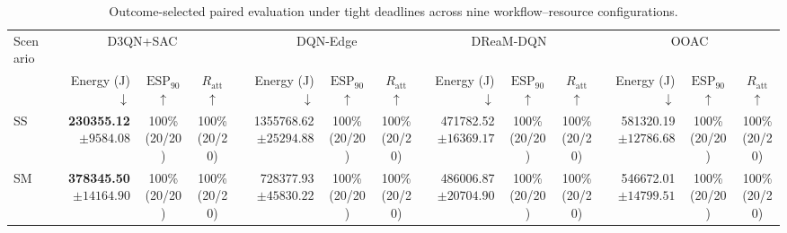 \documentclass[10pt]{article}
\begin{document}
\begin{table}[!htbp]
\centering
\caption{Outcome-selected paired evaluation under tight deadlines across nine workflow--resource configurations.}
\label{tab:conditional_full_tight}
\begingroup
\footnotesize
\setlength{\tabcolsep}{2.2pt}
\renewcommand{\arraystretch}{1.08}
\begin{tabular}{@{}l*{4}{rcc}@{}}
\toprule
Scenario & \multicolumn{3}{c}{D3QN+SAC} & \multicolumn{3}{c}{DQN-Edge} & \multicolumn{3}{c}{DReaM-DQN} & \multicolumn{3}{c}{OOAC} \\
\cmidrule(lr){2-4}\cmidrule(lr){5-7}\cmidrule(lr){8-10}\cmidrule(lr){11-13}
 & Energy (J) $\downarrow$ & $\mathrm{ESP}_{90}$ $\uparrow$ & $R_{\mathrm{att}}$ $\uparrow$ & Energy (J) $\downarrow$ & $\mathrm{ESP}_{90}$ $\uparrow$ & $R_{\mathrm{att}}$ $\uparrow$ & Energy (J) $\downarrow$ & $\mathrm{ESP}_{90}$ $\uparrow$ & $R_{\mathrm{att}}$ $\uparrow$ & Energy (J) $\downarrow$ & $\mathrm{ESP}_{90}$ $\uparrow$ & $R_{\mathrm{att}}$ $\uparrow$ \\
\midrule
SS & \shortstack[r]{\textbf{230355.12}\\$\pm 9584.08$} & \shortstack[c]{100\%\\(20/20)} & \shortstack[c]{100\%\\(20/20)} & \shortstack[r]{1355768.62\\$\pm 25294.88$} & \shortstack[c]{100\%\\(20/20)} & \shortstack[c]{100\%\\(20/20)} & \shortstack[r]{471782.52\\$\pm 16369.17$} & \shortstack[c]{100\%\\(20/20)} & \shortstack[c]{100\%\\(20/20)} & \shortstack[r]{581320.19\\$\pm 12786.68$} & \shortstack[c]{100\%\\(20/20)} & \shortstack[c]{100\%\\(20/20)} \\
SM & \shortstack[r]{\textbf{378345.50}\\$\pm 14164.90$} & \shortstack[c]{100\%\\(20/20)} & \shortstack[c]{100\%\\(20/20)} & \shortstack[r]{728377.93\\$\pm 45830.22$} & \shortstack[c]{100\%\\(20/20)} & \shortstack[c]{100\%\\(20/20)} & \shortstack[r]{486006.87\\$\pm 20704.90$} & \shortstack[c]{100\%\\(20/20)} & \shortstack[c]{100\%\\(20/20)} & \shortstack[r]{546672.01\\$\pm 14799.51$} & \shortstack[c]{100\%\\(20/20)} & \shortstack[c]{100\%\\(20/20)} \\

\end{tabular}
\end{table}
\end{document}
